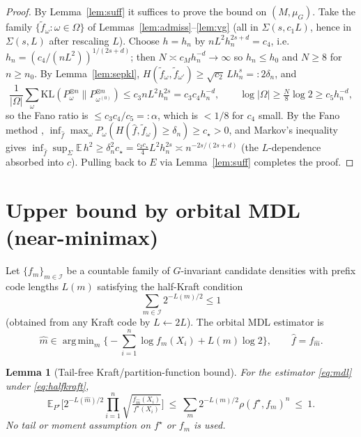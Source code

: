 \documentclass[11pt]{article}
\theoremstyle{plain}
\newtheorem{lemma}[theorem]{Lemma}
\theoremstyle{definition}
\theoremstyle{remark}
\newcommand{\E}{\mathbb{E}}
\newcommand{\KL}{\mathrm{KL}}
\DeclareMathOperator*{\argmin}{arg\,min}
\begin{document}
\begin{proof}
By Lemma~\ref{lem:suff} it suffices to prove the bound on $(M,\mu_G)$. Take the
family $\{\tilde f_\omega:\omega\in\Omega\}$ of
Lemmas~\ref{lem:admiss}--\ref{lem:vg} (all in $\Sigma(s,c_1L)$, hence in
$\Sigma(s,L)$ after rescaling $L$). Choose $h=h_n$ by $nL^2h_n^{2s+d}=c_4$, i.e.\
$h_n=(c_4/(nL^2))^{1/(2s+d)}$; then $N\asymp c_Mh_n^{-d}\to\infty$ so $h_n\le h_0$
and $N\ge8$ for $n\ge n_0$. By Lemma~\ref{lem:sepkl},
$H(\tilde f_\omega,\tilde f_{\omega'})\ge\sqrt{c_2}\,Lh_n^s=:2\delta_n$, and
\[
\frac1{|\Omega|}\sum_\omega\KL(P_\omega^{\otimes n}\|P_{\omega^{(0)}}^{\otimes n})
\le c_3 nL^2h_n^{2s}=c_3c_4h_n^{-d},\qquad
\log|\Omega|\ge\tfrac N8\log2\ge c_5 h_n^{-d},
\]
so the Fano ratio is $\le c_3c_4/c_5=:\alpha$, which is $<1/8$ for $c_4$ small. By
the Fano method {\cite[Thm.~2.7]{tsybakov}},
$\inf_{\widehat f}\max_\omega P_\omega(H(\widehat f,\tilde f_\omega)\ge\delta_n)\ge c_\star>0$,
and Markov's inequality gives
$\inf_{\widehat f}\sup_\Sigma\E\,h^2\ge\delta_n^2 c_\star=\tfrac{c_2c_\star}4L^2h_n^{2s}\asymp n^{-2s/(2s+d)}$
(the $L$-dependence absorbed into $c$). Pulling back to $E$ via Lemma~\ref{lem:suff}
completes the proof.
\end{proof}

\section{Upper bound by orbital MDL (near-minimax)}\label{sec:mdl}

Let $\{f_m\}_{m\in\mathcal I}$ be a countable family of $G$-invariant candidate
densities with prefix code lengths $L(m)$ satisfying the half-Kraft condition
\begin{equation}\label{eq:halfkraft}
\sum_{m\in\mathcal I}2^{-L(m)/2}\le1
\end{equation}
(obtained from any Kraft code by $L\leftarrow2L$). The orbital MDL estimator is
\begin{equation}\label{eq:mdl}
\widehat m\in\argmin_m\Big\{-\sum_{i=1}^n\log f_m(X_i)+L(m)\log2\Big\},\qquad
\widehat f=f_{\widehat m}.
\end{equation}

\begin{lemma}[Tail-free Kraft/partition-function bound]\label{lem:partition}
For the estimator \eqref{eq:mdl} under \eqref{eq:halfkraft},
\[
\E_{P^\star}\!\Big[2^{-L(\widehat m)/2}\prod_{i=1}^n\sqrt{\tfrac{f_{\widehat m}(X_i)}{f^\star(X_i)}}\Big]
\ \le\ \sum_m 2^{-L(m)/2}\rho(f^\star,f_m)^n\ \le\ 1 .
\]
No tail or moment assumption on $f^\star$ or $f_m$ is used.
\end{lemma}
\end{document}
